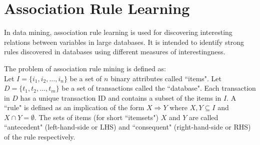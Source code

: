 \chapter{Association Rule Learning}
In data mining, association rule learning is used for discovering interesting relations between variables in large databases. It is intended to identify strong rules discovered in databases using different measures of interestingness. 

The problem of association rule mining is defined as:\\
Let \begin{math}I=\{i_1, i_2,\ldots,i_n\}\end{math} be a set of \begin{math}n\end{math} binary attributes called ``items". Let \begin{math}D = \{t_1, t_2, \ldots, t_m\}\end{math} be a set of transactions called the ``database". Each transaction in \begin{math}D\end{math} has a unique transaction ID and contains a subset of the items in \begin{math}I\end{math}. A ``rule" is defined as an implication of the form \begin{math}X \Rightarrow Y\end{math} where \begin{math}X, Y \subseteq I\end{math} and \begin{math}X \cap Y = \emptyset\end{math}. The sets of items (for short ``itemsets") \begin{math}X\end{math} and \begin{math}Y\end{math} are called ``antecedent" (left-hand-side or LHS) and ``consequent" (right-hand-side or RHS) of the rule respectively.

